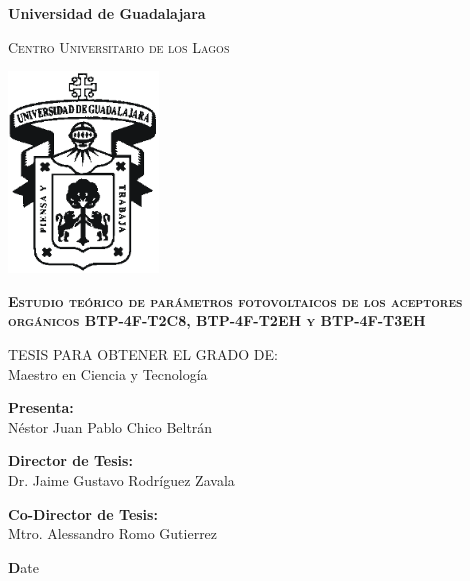 \documentclass[12pt]{report}
\begin{document}
\setlength{\hoffset}{27 pt} %
\begin{titlepage}
{\centering
{\bfseries\LARGE Universidad de Guadalajara \par}
\vspace{0.5cm}
{\scshape\Large Centro Universitario de los Lagos \par}
\vspace{1cm}
{\graphicspath{{imagenes/Portada}} %
\includegraphics[width=0.3\textwidth]{image.png}\par}
\vspace{1cm}
{\scshape\large\bfseries Estudio teórico de parámetros fotovoltaicos de los aceptores orgánicos BTP-4F-T2C8, BTP-4F-T2EH y BTP-4F-T3EH \par}
\vspace{1.5cm}
{\normalsize TESIS PARA OBTENER EL GRADO DE: \\ Maestro en Ciencia y Tecnología}
\vfill
{\large \textbf{Presenta:} \\Néstor Juan Pablo Chico Beltrán \par}
\vfill
{\large \textbf{Director de Tesis:} \\Dr. Jaime Gustavo Rodríguez Zavala \par}
\vfill
{\large \textbf{Co-Director de Tesis:} \\Mtro. Alessandro Romo Gutierrez \par}
\vfill
\vfill
{\normalsize \textbf Date
\vfill}}
{\large  \par}
\end{titlepage}
\end{document}
